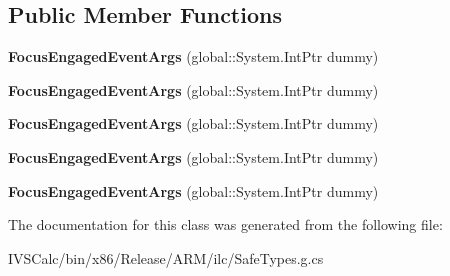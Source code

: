 \subsection*{Public Member Functions}
\begin{DoxyCompactItemize}
\item 
\mbox{\label{class_windows_1_1_u_i_1_1_xaml_1_1_controls_1_1_focus_engaged_event_args_afe77b31bebb2999f24506ad58afde461}} 
{\bfseries Focus\+Engaged\+Event\+Args} (global\+::\+System.\+Int\+Ptr dummy)
\item 
\mbox{\label{class_windows_1_1_u_i_1_1_xaml_1_1_controls_1_1_focus_engaged_event_args_afe77b31bebb2999f24506ad58afde461}} 
{\bfseries Focus\+Engaged\+Event\+Args} (global\+::\+System.\+Int\+Ptr dummy)
\item 
\mbox{\label{class_windows_1_1_u_i_1_1_xaml_1_1_controls_1_1_focus_engaged_event_args_afe77b31bebb2999f24506ad58afde461}} 
{\bfseries Focus\+Engaged\+Event\+Args} (global\+::\+System.\+Int\+Ptr dummy)
\item 
\mbox{\label{class_windows_1_1_u_i_1_1_xaml_1_1_controls_1_1_focus_engaged_event_args_afe77b31bebb2999f24506ad58afde461}} 
{\bfseries Focus\+Engaged\+Event\+Args} (global\+::\+System.\+Int\+Ptr dummy)
\item 
\mbox{\label{class_windows_1_1_u_i_1_1_xaml_1_1_controls_1_1_focus_engaged_event_args_afe77b31bebb2999f24506ad58afde461}} 
{\bfseries Focus\+Engaged\+Event\+Args} (global\+::\+System.\+Int\+Ptr dummy)
\end{DoxyCompactItemize}


The documentation for this class was generated from the following file\+:\begin{DoxyCompactItemize}
\item 
I\+V\+S\+Calc/bin/x86/\+Release/\+A\+R\+M/ilc/Safe\+Types.\+g.\+cs\end{DoxyCompactItemize}

